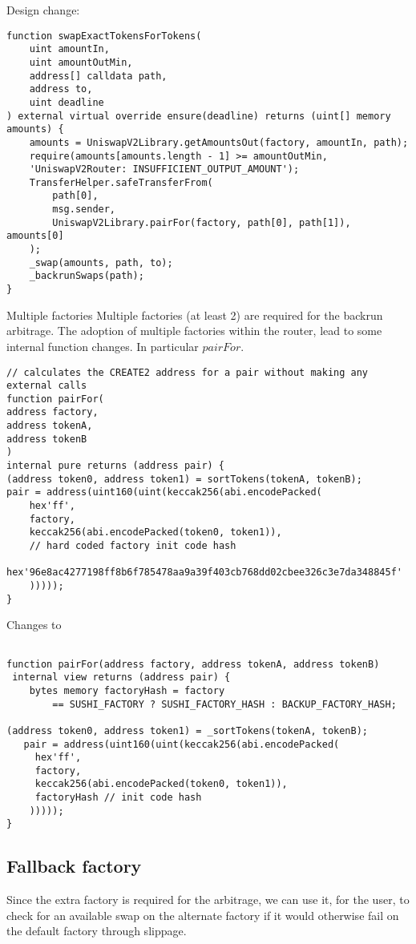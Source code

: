 \documentclass[runningheads]{llncs}
\begin{document}
Design change:

\label{After swapExactTokensforTokens:2}
\begin{verbatim}
function swapExactTokensForTokens(
    uint amountIn,
    uint amountOutMin,
    address[] calldata path,
    address to,
    uint deadline
) external virtual override ensure(deadline) returns (uint[] memory amounts) {
    amounts = UniswapV2Library.getAmountsOut(factory, amountIn, path);
    require(amounts[amounts.length - 1] >= amountOutMin, 
    'UniswapV2Router: INSUFFICIENT_OUTPUT_AMOUNT');
    TransferHelper.safeTransferFrom(
        path[0],
        msg.sender, 
        UniswapV2Library.pairFor(factory, path[0], path[1]), amounts[0]
    );
    _swap(amounts, path, to);
    _backrunSwaps(path);
}
\end{verbatim}

Multiple factories
Multiple factories (at least 2) are required for the backrun arbitrage. The adoption of multiple factories within the router, lead to some internal function changes. In particular $pairFor$.

\label{CREATE2 Factory:3}
\begin{verbatim}
// calculates the CREATE2 address for a pair without making any external calls
function pairFor(
address factory, 
address tokenA, 
address tokenB
) 
internal pure returns (address pair) {
(address token0, address token1) = sortTokens(tokenA, tokenB);
pair = address(uint160(uint(keccak256(abi.encodePacked(
    hex'ff',
    factory,
    keccak256(abi.encodePacked(token0, token1)),
    // hard coded factory init code hash
    hex'96e8ac4277198ff8b6f785478aa9a39f403cb768dd02cbee326c3e7da348845f'
    )))));
}
\end{verbatim}

Changes to 
\begin{verbatim}

function pairFor(address factory, address tokenA, address tokenB) 
 internal view returns (address pair) {
    bytes memory factoryHash = factory
        == SUSHI_FACTORY ? SUSHI_FACTORY_HASH : BACKUP_FACTORY_HASH;

(address token0, address token1) = _sortTokens(tokenA, tokenB);
   pair = address(uint160(uint(keccak256(abi.encodePacked(
     hex'ff',
     factory,
     keccak256(abi.encodePacked(token0, token1)),
     factoryHash // init code hash
    )))));
}
\end{verbatim}

\subsection{Fallback factory}
Since the extra factory is required for the arbitrage, we can use it, for the user, to check for an available swap on the alternate factory if it would otherwise fail on the default factory through slippage.
\end{document}
